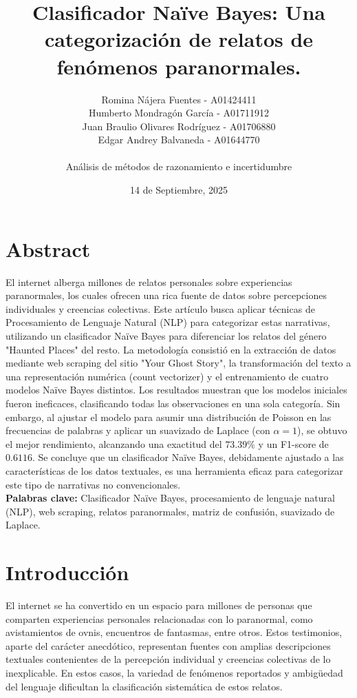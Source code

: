 \documentclass[12pt, letterpaper]{report}
\title{Clasificador Naïve Bayes: Una categorización de relatos de fenómenos paranormales.}
\author{ Romina Nájera Fuentes - A01424411 \\ Humberto Mondragón García - A01711912 \\ Juan Braulio Olivares Rodríguez - A01706880 \\ Edgar Andrey Balvaneda - A01644770
 \\ \\ Análisis de métodos de razonamiento e incertidumbre}
\date{14 de Septiembre, 2025}
\begin{document}
\maketitle
\section*{Abstract}

El internet alberga millones de relatos personales sobre experiencias paranormales, los cuales ofrecen una rica fuente de datos sobre percepciones individuales y creencias colectivas. Este artículo busca aplicar técnicas de Procesamiento de Lenguaje Natural (NLP) para categorizar estas narrativas, utilizando un clasificador Naïve Bayes para diferenciar los relatos del género "Haunted Places" del resto. La metodología consistió en la extracción de datos mediante web scraping del sitio "Your Ghost Story", la transformación del texto a una representación numérica (count vectorizer) y el entrenamiento de cuatro modelos Naïve Bayes distintos. Los resultados muestran que los modelos iniciales fueron ineficaces, clasificando todas las observaciones en una sola categoría. Sin embargo, al ajustar el modelo para asumir una distribución de Poisson en las frecuencias de palabras y aplicar un suavizado de Laplace (con $\alpha=1$), se obtuvo el mejor rendimiento, alcanzando una exactitud del $73.39\%$ y un F1-score de $0.6116$. Se concluye que un clasificador Naïve Bayes, debidamente ajustado a las características de los datos textuales, es una herramienta eficaz para categorizar este tipo de narrativas no convencionales.
\\

\textbf{Palabras clave:} Clasificador Naïve Bayes, procesamiento de lenguaje natural (NLP), web scraping, relatos paranormales, matriz de confusión, suavizado de Laplace.

\section*{Introducción}

El internet se ha convertido en un espacio para millones de personas que comparten experiencias personales relacionadas con lo paranormal, como avistamientos de ovnis, encuentros de fantasmas, entre otros. Estos testimonios, aparte del carácter anecdótico, representan fuentes con amplias descripciones textuales contenientes de la percepción individual y creencias colectivas de lo inexplicable. En estos casos, la variedad de fenómenos reportados y ambigüedad del lenguaje dificultan la clasificación sistemática de estos relatos.
\\
\end{document}

